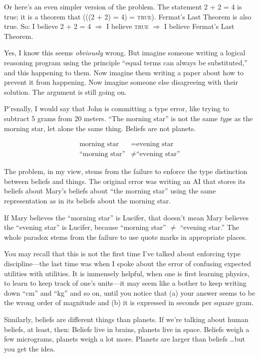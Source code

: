 {
 Or here's an even simpler version of the problem.
The statement 2 + 2 = 4 is true; it is a theorem that (((2 + 2) = 4) =
\textsc{true}). Fermat's Last Theorem is also true. So: I
believe 2 + 2 = 4 $\Rightarrow $ I believe \textsc{true} $\Rightarrow $ I
believe Fermat's Last Theorem.}

{
 Yes, I know this seems \textit{obviously} wrong. But imagine
someone writing a logical reasoning program using the principle
``equal terms can always be
substituted,'' and this happening to them. Now
imagine them writing a paper about how to prevent it from happening.
Now imagine someone else disagreeing with their solution. The argument
is still going on.}

{
 P'rsnally, I would say that John is committing a
type error, like trying to subtract 5 grams from 20 meters.
``The morning star'' is not the same
\textit{type} as the morning star, let alone the same thing. Beliefs
are not planets.}

\begin{align*}
\text{morning star} &= \text{evening star}\\
\text{``morning star''} &\neq \text{``evening star''}
\end{align*}

{
 The problem, in my view, stems from the failure to enforce the
type distinction between beliefs and things. The original error was
writing an AI that stores its beliefs about Mary's
beliefs about ``the morning star''
using the same representation as in its beliefs about the morning
star.}

{
 If Mary believes the ``morning
star'' is Lucifer, that doesn't mean
Mary believes the ``evening star''
is Lucifer, because ``morning star''
${\neq}$ ``evening star.'' The whole
paradox stems from the failure to use quote marks in appropriate
places.}

{
 You may recall that this is not the first time
I've talked about enforcing type discipline---the last
time was when I spoke about the error of confusing expected utilities
with utilities. It is immensely helpful, when one is first learning
physics, to learn to keep track of one's units---it may
seem like a bother to keep writing down
``cm'' and
``kg'' and so on, until you notice
that (a) your answer seems to be the wrong order of magnitude and (b)
it is expressed in seconds per square gram.}

{
 Similarly, beliefs are different things than planets. If
we're talking about human beliefs, at least, then:
Beliefs live in brains, planets live in space. Beliefs weigh a few
micrograms, planets weigh a lot more. Planets are larger than beliefs
\ldots but you get the idea.}

